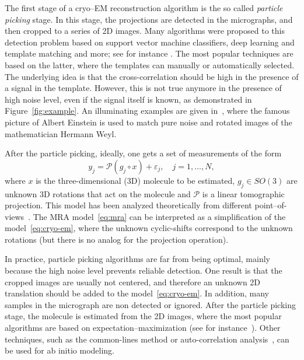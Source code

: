 \documentclass[journal]{IEEEtran}
\numberwithin{equation}{section}
\numberwithin{figure}{section}
\theoremstyle{plain}
\theoremstyle{definition}
\theoremstyle{remark}
\theoremstyle{plain}
\theoremstyle{remark}
\theoremstyle{plain}
\theoremstyle{plain}
\begin{document}
The first stage of a cryo--EM reconstruction algorithm is the so called \emph{particle picking} stage. In this stage, the projections are detected in the micrographs, and then cropped to a series of 2D images.  Many algorithms were proposed to this detection problem based on support vector machine classifiers, deep learning and template matching and more; see for instance \cite{frank1983automatic,scheres2015semi,arbelaez2011experimental,zhu2016deep}.
 The most popular techniques are based on the latter, where the templates can manually or automatically selected.  The underlying idea is that the cross-correlation  should be high in the presence of a signal in the template. However, this is not true anymore in the presence of high noise level, even if the signal itself is known, as demonstrated in Figure~\ref{fig:example}. An illuminating examples are given in~\cite{shatsky2009method,bandeira2015non}, where the famous picture of Albert Einstein is used to match pure noise and rotated images of the mathematician  Hermann Weyl.
 
 
After the particle picking, ideally, one gets a set of measurements of the form 
\begin{equation} \label{eq:cryo-em}
y_j = \mathcal{P}( g_j\circ x) + \varepsilon_j,\quad j=1,\ldots,N, 
\end{equation}
where $x$ is the three-dimensional (3D) molecule to be estimated,  $g_j\in SO(3)$ are unknown 3D rotations that act on the molecule and $\mathcal{P}$ is a linear tomographic projection. This model has been analyzed theoretically from different point--of-views~\cite{bandeira2015non,hadani2011representation}. The MRA model~\eqref{eq:mra} can be interpreted as a simplification of the model~\eqref{eq:cryo-em}, where the unknown cyclic-shifts correspond to the unknown rotations (but there is no analog for the projection operation).

In practice, particle picking algorithms are far from being optimal, mainly because the high noise level prevents reliable detection. One result is that the cropped images are usually not centered,  and therefore an unknown 2D translation should be added to the model~\eqref{eq:cryo-em}.
In addition, many samples in the micrograph are non detected or ignored.
After the particle picking stage, the molecule is estimated from the 2D images, where the most popular algorithms are based on expectation--maximization (see for instance~\cite{scheres2012relion}). Other techniques, such as the common-lines\cite{van1987angular,singer2011three} method or auto-correlation analysis~\cite{kam1980reconstruction,levin20173d}, can be used for ab initio modeling. 
 
\end{document}
